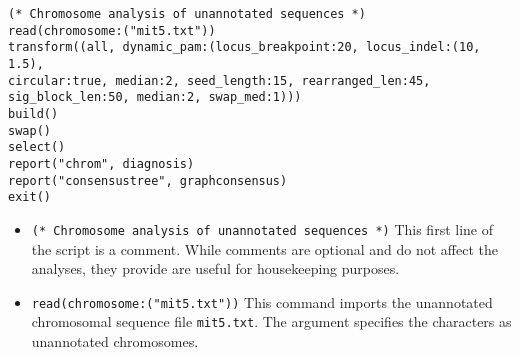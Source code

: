 \begin{verbatim}
(* Chromosome analysis of unannotated sequences *)
read(chromosome:("mit5.txt"))
transform((all, dynamic_pam:(locus_breakpoint:20, locus_indel:(10, 1.5), 
circular:true, median:2, seed_length:15, rearranged_len:45,
sig_block_len:50, median:2, swap_med:1)))
build()
swap()
select()
report("chrom", diagnosis)
report("consensustree", graphconsensus)
exit()
\end{verbatim}


\begin{itemize}
\item \texttt{(* Chromosome analysis of unannotated sequences *)} This first line of the script is a comment. While comments are optional and do not affect the analyses, they provide are useful for housekeeping purposes.
\item \texttt{read(chromosome:("mit5.txt"))} This command imports the unannotated chromosomal sequence file \texttt{mit5.txt}. The argument  specifies the characters as unannotated chromosomes.

\end{itemize}
